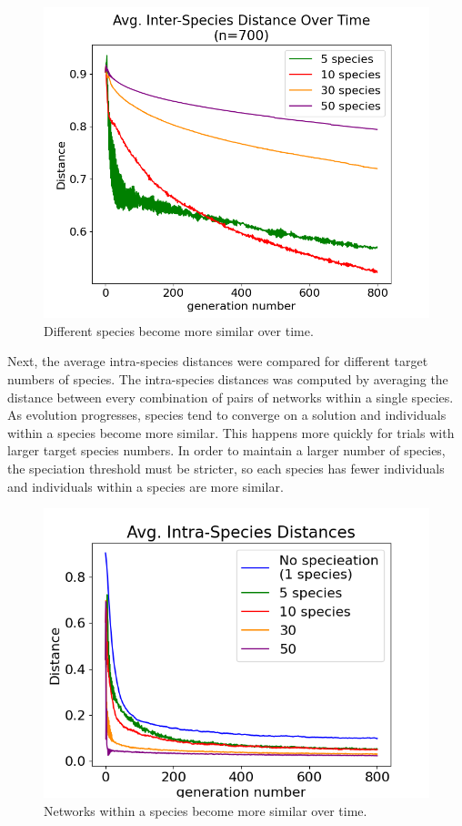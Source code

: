\documentclass[12pt]{report}
\begin{document}
\begin{figure}
\centering
    \includegraphics[width=15cm]{images/avg_species_differences.png}
    \caption[Average inter-species distance over time]{Different species become more similar over time.}
    \label{fig:avg_species_differences}
\end{figure}

Next, the average intra-species distances were compared for different target numbers of species. The intra-species distances was computed by averaging the distance between every combination of pairs of networks within a single species. As evolution progresses, species tend to converge on a solution and individuals within a species become more similar. This happens more quickly for trials with larger target species numbers. In order to maintain a larger number of species, the speciation threshold must be stricter, so each species has fewer individuals and individuals within a species are more similar.

\begin{figure}
\centering
    \includegraphics[width=15cm]{images/intraspecies_distance.png}
    \caption[Average intra-species distance over time]{Networks within a species become more similar over time.}
    \label{fig:intra_species_distance}
\end{figure}
\end{document}
